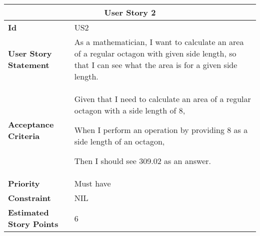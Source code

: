 \hspace{1cm}
\begin{center}
\begin{tabular}{ | m{2cm} | m{12cm} | } 

 \hline
 \multicolumn{2}{|c|}{\textbf{User Story 2}} \\

\hline
\textbf{Id} & US2 \\ 

\hline
\textbf{User Story Statement} &  As a mathematician, I want to calculate an area of a regular octagon with given side length, so that I can see what the area is for a given side length.\\ 

\hline
\textbf{Acceptance Criteria} &  
Given that I need to calculate an area of a regular octagon with a side length of 8,

When I perform an operation by providing 8 as a side length of an octagon,

Then I should see 309.02 as an answer.\\ 

\hline
\textbf{Priority} & Must have \\ 

\hline
\textbf{Constraint} & NIL\\ 

\hline
\textbf{Estimated Story Points} & 6 \\
\hline

\end{tabular}
\end{center}

